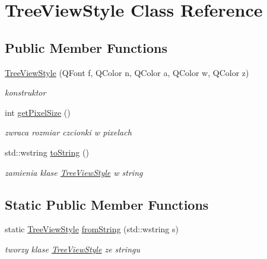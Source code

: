 \hypertarget{class_tree_view_style}{
\section{TreeViewStyle Class Reference}
\label{class_tree_view_style}
}
\subsection*{Public Member Functions}
\begin{DoxyCompactItemize}
\item 
\hyperlink{class_tree_view_style_af36cf99bfd7630c91d56ea8b94a1c367}{TreeViewStyle} (QFont f, QColor n, QColor a, QColor w, QColor z)
\begin{DoxyCompactList}\small\item\em konstruktor \item\end{DoxyCompactList}\item 
\hypertarget{class_tree_view_style_ab7f7d726ba5fee94aed228c2f46f5210}{
int \hyperlink{class_tree_view_style_ab7f7d726ba5fee94aed228c2f46f5210}{getPixelSize} ()}
\label{class_tree_view_style_ab7f7d726ba5fee94aed228c2f46f5210}

\begin{DoxyCompactList}\small\item\em zwraca rozmiar czcionki w pixelach \item\end{DoxyCompactList}\item 
\hypertarget{class_tree_view_style_a4be2471e4977217f74100fd785b1b7e4}{
std::wstring \hyperlink{class_tree_view_style_a4be2471e4977217f74100fd785b1b7e4}{toString} ()}
\label{class_tree_view_style_a4be2471e4977217f74100fd785b1b7e4}

\begin{DoxyCompactList}\small\item\em zamienia klase \hyperlink{class_tree_view_style}{TreeViewStyle} w string \item\end{DoxyCompactList}\end{DoxyCompactItemize}
\subsection*{Static Public Member Functions}
\begin{DoxyCompactItemize}
\item 
\hypertarget{class_tree_view_style_ad80635ab20811e40b587e9dd080f98f1}{
static \hyperlink{class_tree_view_style}{TreeViewStyle} \hyperlink{class_tree_view_style_ad80635ab20811e40b587e9dd080f98f1}{fromString} (std::wstring s)}
\label{class_tree_view_style_ad80635ab20811e40b587e9dd080f98f1}

\begin{DoxyCompactList}\small\item\em tworzy klase \hyperlink{class_tree_view_style}{TreeViewStyle} ze stringu \item\end{DoxyCompactList}\end{DoxyCompactItemize}
